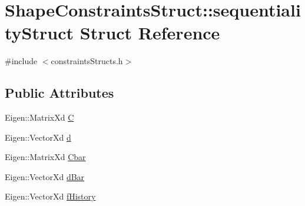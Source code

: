 \hypertarget{structShapeConstraintsStruct_1_1sequentialityStruct}{\section{\-Shape\-Constraints\-Struct\-:\-:sequentiality\-Struct \-Struct \-Reference}
\label{structShapeConstraintsStruct_1_1sequentialityStruct}
}


{\ttfamily \#include $<$constraints\-Structs.\-h$>$}

\subsection*{\-Public \-Attributes}
\begin{DoxyCompactItemize}
\item 
\-Eigen\-::\-Matrix\-Xd \hyperlink{structShapeConstraintsStruct_1_1sequentialityStruct_acbb064e5a1baab8b79ffd6c367f31054}{\-C}
\item 
\-Eigen\-::\-Vector\-Xd \hyperlink{structShapeConstraintsStruct_1_1sequentialityStruct_a029a0d4aa9db75b508f9149a262ed28d}{d}
\item 
\-Eigen\-::\-Matrix\-Xd \hyperlink{structShapeConstraintsStruct_1_1sequentialityStruct_a9b9ba6ba7272ef35f2588d852ed967f3}{\-Cbar}
\item 
\-Eigen\-::\-Vector\-Xd \hyperlink{structShapeConstraintsStruct_1_1sequentialityStruct_a68d3aa9f05279aa1ba92e60205a68677}{d\-Bar}
\item 
\-Eigen\-::\-Vector\-Xd \hyperlink{structShapeConstraintsStruct_1_1sequentialityStruct_aa5a0454f0be11f06111cce4ab94db891}{f\-History}
\end{DoxyCompactItemize}


